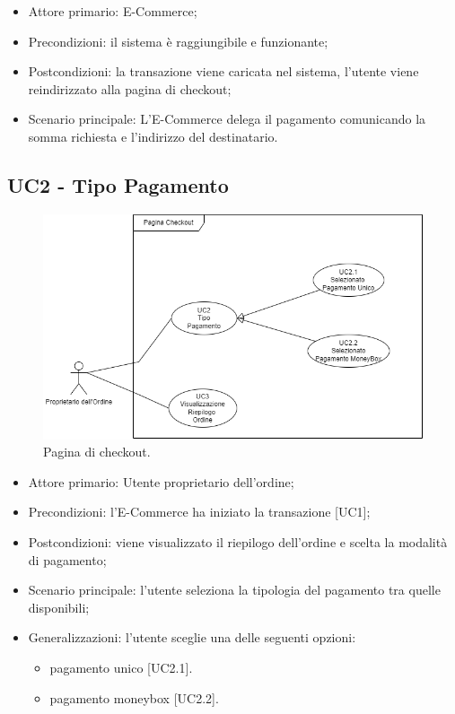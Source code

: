 \begin{itemize}
    \item Attore primario: E-Commerce;
    \item Precondizioni: il sistema è raggiungibile e funzionante;
    \item Postcondizioni: la transazione viene caricata nel sistema, l'utente viene reindirizzato alla pagina di checkout;
    \item Scenario principale: L'E-Commerce delega il pagamento comunicando la somma richiesta e l'indirizzo del destinatario.
\end{itemize}

\subsection{UC2 - Tipo Pagamento}

    \begin{figure}[H]
    \centering
    \includegraphics[scale=0.7]{immagini/UseCases-UC2-1.png}
    \caption{Pagina di checkout.}
  \end{figure}

    \begin{itemize}
    \item Attore primario: Utente proprietario dell'ordine;
    \item Precondizioni: l'E-Commerce ha iniziato la transazione [UC1];
    \item Postcondizioni: viene visualizzato il riepilogo dell'ordine e scelta la modalità di pagamento;
    \item Scenario principale: l'utente seleziona la tipologia del pagamento tra quelle disponibili;
    \item Generalizzazioni: l'utente sceglie una delle seguenti opzioni:
    \begin{itemize}
        \item pagamento unico [UC2.1].
        \item pagamento moneybox [UC2.2].
    \end{itemize}
    \end{itemize}
    \clearpage

